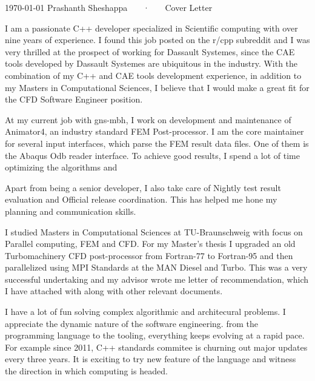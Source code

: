 \documentclass[11pt, a4paper]{awesome-cv}
\begin{document}
\makecvheader[R]

\makecvfooter
  {\today}
  {Prashanth Sheshappa ~~~·~~~ Cover Letter}
  {}

\makelettertitle

\begin{cvletter}


I am a passionate C++ developer specialized in Scientific computing with over nine years of experience.
I found this job posted on the r/cpp subreddit and I was very thrilled at the prospect of working for Dassault Systemes, since
the CAE tools developed by Dassault Systemes are ubiquitous in the industry. With the combination of my C++  
and CAE tools development experience, in addition to my Masters in Computational Sciences, I believe that I would make a great 
fit for the CFD Software Engineer position.

At my current job with gns-mbh, I work on development and maintenance of Animator4, an industry standard FEM Post-processor.  
I am the core maintainer for several input interfaces, which parse the FEM result data files. 
One of them is the Abaqus Odb reader interface. To achieve good results, I spend a lot of time optimizing the algorithms and 

Apart from being a senior developer, I also take care of Nightly test result evaluation and Official release coordination. 
This has helped me hone my planning and communication skills.

I studied Masters in Computational Sciences at TU-Braunschweig with focus on Parallel computing, FEM and CFD. For my Master's thesis 
I upgraded an old Turbomachinery CFD post-processor from Fortran-77 to Fortran-95 and then parallelized using MPI Standards at the 
MAN Diesel and Turbo. 
This was a very successful undertaking and my advisor wrote me letter of recommendation, 
which I have attached with along with other relevant documents. 

I have a lot of fun solving complex algorithmic and architecural problems. I appreciate the dynamic nature of the software engineering. from the programming language to the tooling, everything keeps evolving at a rapid pace. For example since 2011, C++ standards commitee is churning out major updates every three years. It is exciting to try new feature of the language and witness the direction in which computing is headed.




\end{cvletter}
\end{document}
